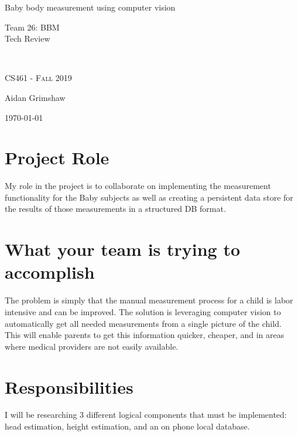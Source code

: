 \documentclass[letterpaper,10pt,draftclsnofoot,onecolumn,compsoc]{IEEEtran}
\def\name{Aidan Grimshaw}
\begin{document}
\begin{titlepage}
\centering
\vspace*{6cm}
{\scshape\LARGE \begin{singlespace}Baby body measurement using computer vision\\ \end{singlespace} Team 26: BBM \\ Tech Review } \\
	{\scshape\Large CS461 - Fall 2019 \par}
	\vspace{.5cm}
	\name \par
    {\large \today \par} 
	\vspace*{1cm}
	
\end{titlepage}

\section{Project Role}
My role in the project is to collaborate on implementing the measurement functionality for the Baby subjects as well as creating a persistent data store for the results of those measurements in a structured DB format.

\section{What your team is trying to accomplish}

The problem is simply that the manual measurement process for a child is labor intensive and can be improved. The solution is leveraging computer vision to automatically get all needed measurements from a single picture of the child. This will enable parents to get this information quicker, cheaper, and in areas where medical providers are not easily available.
\section{Responsibilities}
I will be researching 3 different logical components that must be implemented: head estimation, height estimation, and an on phone local database. 
\end{document}
